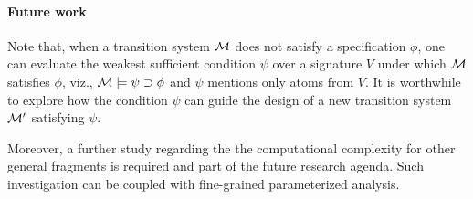 \documentclass{article}
\begin{document}
\paragraph{Future work}
Note that, when a transition system $\cal M$ does not satisfy a specification $\phi$, one can evaluate the weakest sufficient condition  $\psi$ over a signature $V$ under which ${\cal M}$ satisfies $\phi$, viz., ${\cal M}\models\psi\supset \phi$ and $\psi$ mentions only atoms from $V$. It is worthwhile to explore how the condition $\psi$ can guide the design of a new transition system ${\cal M}'$ satisfying $\psi$.



Moreover, a further study regarding the the computational complexity for other general fragments is required and part of the future research agenda. Such investigation can be coupled with fine-grained parameterized analysis.
\end{document}
